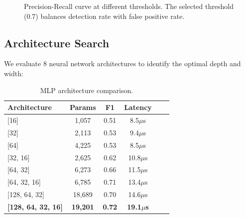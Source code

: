 \begin{figure}[t]
\centering
{}
\caption{Precision-Recall curve at different thresholds. The selected threshold (0.7) balances detection rate with false positive rate.}
\label{fig:pr-curve}
\end{figure}

\subsection{Architecture Search}
\label{sec:eval-architecture}

We evaluate 8 neural network architectures to identify the optimal depth and width:

\begin{table}[t]
\centering
\caption{MLP architecture comparison.}
\label{tab:architecture}
\begin{tabular}{lccccc}
\toprule
\textbf{Architecture} & \textbf{Params} & \textbf{F1} & \textbf{Latency} \\
\midrule
{[}16{]} & 1,057 & 0.51 & 8.5$\mu$s \\
{[}32{]} & 2,113 & 0.53 & 9.4$\mu$s \\
{[}64{]} & 4,225 & 0.53 & 8.5$\mu$s \\
{[}32, 16{]} & 2,625 & 0.62 & 10.8$\mu$s \\
{[}64, 32{]} & 6,273 & 0.66 & 11.5$\mu$s \\
{[}64, 32, 16{]} & 6,785 & 0.71 & 13.4$\mu$s \\
{[}128, 64, 32{]} & 18,689 & 0.70 & 14.6$\mu$s \\
\textbf{{[}128, 64, 32, 16{]}} & \textbf{19,201} & \textbf{0.72} & \textbf{19.1$\mu$s} \\
\bottomrule
\end{tabular}
\end{table}

